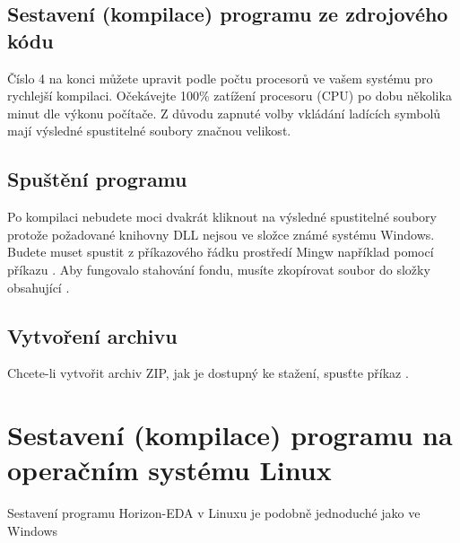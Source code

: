 \documentclass[letterpaper,10pt,czech]{sphinxmanual}
\begin{document}
\section{Sestavení (kompilace) programu ze zdrojového kódu}
\label{\detokenize{build-win32_cz:sestaveni-kompilace-programu-ze-zdrojoveho-kodu}}
\begin{sphinxVerbatim}[commandchars=\\\{\}]
  
\end{sphinxVerbatim}

Číslo 4 na konci můžete upravit podle počtu procesorů ve vašem systému pro rychlejší kompilaci. Očekávejte 100\% zatížení procesoru (CPU) po dobu několika minut dle výkonu počítače. Z důvodu zapnuté volby vkládání ladících symbolů mají výsledné spustitelné soubory značnou velikost.


\section{Spuštění programu}
\label{\detokenize{build-win32_cz:spusteni-programu}}
Po kompilaci nebudete moci dvakrát kliknout na výsledné spustitelné soubory protože požadované knihovny DLL nejsou ve složce známé systému Windows. Budete muset spustit z příkazového řádku prostředí Mingw například pomocí příkazu .
Aby fungovalo stahování fondu, musíte zkopírovat soubor  do složky obsahující .


\section{Vytvoření archivu}
\label{\detokenize{build-win32_cz:vytvoreni-archivu}}
Chcete-li vytvořit archiv ZIP, jak je dostupný ke stažení, spusťte příkaz
.


\chapter{Sestavení (kompilace) programu na operačním systému Linux}
\label{\detokenize{build-linux_cz:sestaveni-kompilace-programu-na-operacnim-systemu-linux}}\label{\detokenize{build-linux_cz::doc}}
Sestavení programu Horizon-EDA v Linuxu je podobně jednoduché jako ve Windows
\end{document}

